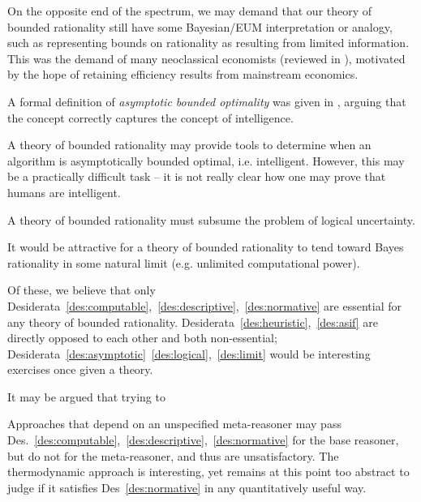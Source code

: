 \begin{desideratum}
    \label{des:asif}
    On the opposite end of the spectrum, we may demand that our theory of bounded rationality still have some Bayesian/EUM interpretation or analogy, such as representing bounds on rationality as resulting from limited information. This was the demand of many neoclassical economists (reviewed in \cite{oldreview_arrow}), motivated by the hope of retaining efficiency results from mainstream economics.
\end{desideratum}

\begin{desideratum}
    \label{des:asymptotic}
    A formal definition of \emph{asymptotic bounded optimality} was given in \cite{bounded_optimality_intelligence}, arguing that the concept correctly captures the concept of intelligence. 
    
    A theory of bounded rationality may provide tools to determine when an algorithm is asymptotically bounded optimal, i.e. intelligent. However, this may be a practically difficult task -- it is not really clear how one may prove that humans are intelligent. 
\end{desideratum}

\begin{desideratum}
    \label{des:logical}
    A theory of bounded rationality must subsume the problem of logical uncertainty.
\end{desideratum}

\begin{desideratum}
    \label{des:limit}
    It would be attractive for a theory of bounded rationality to tend toward Bayes rationality in some natural limit (e.g. unlimited computational power). 
\end{desideratum}



Of these, we believe that only Desiderata~\ref{des:computable},~\ref{des:descriptive},~\ref{des:normative} are essential for any theory of bounded rationality. Desiderata~\ref{des:heuristic},~\ref{des:asif} are directly opposed to each other and both non-essential; Desiderata~\ref{des:asymptotic}~\ref{des:logical},~\ref{des:limit} would be interesting exercises once given a theory. 

It may be argued that trying to 

\begin{remark}
    Approaches that depend on an unspecified meta-reasoner may pass Des.~\ref{des:computable},~\ref{des:descriptive},~\ref{des:normative} for the base reasoner, but do not for the meta-reasoner, and thus are unsatisfactory. The thermodynamic approach is interesting, yet remains at this point too abstract to judge if it satisfies Des~\ref{des:normative} in any quantitatively useful way.
\end{remark}